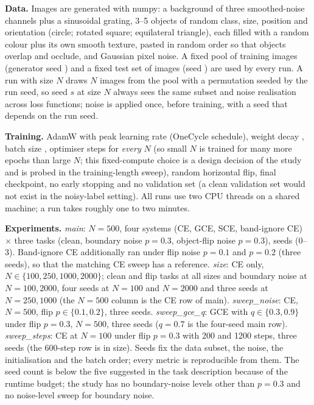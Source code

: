 \textbf{Data.} Images are generated with numpy: a background of three smoothed-noise channels plus a sinusoidal grating, 3--5 objects of random class, size, position and orientation (circle; rotated square; equilateral triangle), each filled with a random colour plus its own smooth texture, pasted in random order so that objects overlap and occlude, and Gaussian pixel noise. A fixed pool of  training images (generator seed ) and a fixed test set of  images (seed ) are used by every run. A run with size $N$ draws $N$ images from the pool with a permutation seeded by the run seed, so seed $s$ at size $N$ always sees the same subset and noise realisation across loss functions; noise is applied once, before training, with a seed that depends on the run seed.

\textbf{Training.} AdamW with peak learning rate  (OneCycle schedule), weight decay , batch size ,  optimiser steps for \emph{every} $N$ (so small $N$ is trained for many more epochs than large $N$; this fixed-compute choice is a design decision of the study and is probed in the training-length sweep), random horizontal flip, final checkpoint, no early stopping and no validation set (a clean validation set would not exist in the noisy-label setting). All runs use two CPU threads on a shared machine; a run takes roughly one to two minutes.

\textbf{Experiments.} \emph{main}: $N=500$, four systems (CE, GCE, SCE, band-ignore CE) $\times$ three tasks (clean, boundary noise $p=0.3$, object-flip noise $p=0.3$),  seeds (0--3). Band-ignore CE additionally ran under flip noise $p=0.1$ and $p=0.2$ (three seeds), so that the matching CE sweep has a reference. \emph{size}: CE only, $N\in\{100,250,1000,2000\}$; clean and flip tasks at all sizes and boundary noise at $N=100,2000$, four seeds at $N=100$ and $N=2000$ and three seeds at $N=250,1000$ (the $N=500$ column is the CE row of main). \emph{sweep\_noise}: CE, $N=500$, flip $p\in\{0.1,0.2\}$, three seeds. \emph{sweep\_gce\_q}: GCE with $q\in\{0.3,0.9\}$ under flip $p=0.3$, $N=500$, three seeds ($q=0.7$ is the four-seed main row). \emph{sweep\_steps}: CE at $N=100$ under flip $p=0.3$ with 200 and 1200 steps, three seeds (the 600-step row is in size). Seeds fix the data subset, the noise, the initialisation and the batch order; every metric is reproducible from them. The seed count is below the five suggested in the task description because of the runtime budget; the study has no boundary-noise levels other than $p=0.3$ and no noise-level sweep for boundary noise.

